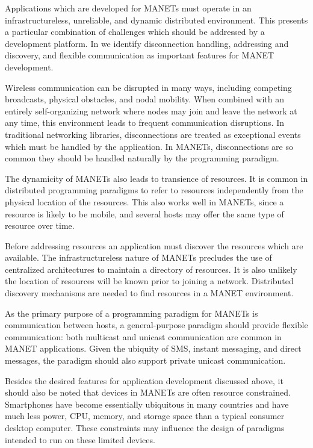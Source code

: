 \documentclass[lnicst]{svmultln}
\begin{document}
Applications which are developed for MANETs must operate in an infrastructureless, unreliable, and dynamic distributed environment. This presents a particular combination of challenges which should be addressed by a development platform. In \cite{mine} we identify disconnection handling, addressing and discovery, and flexible communication as important features for MANET development.

Wireless communication can be disrupted in many ways, including competing broadcasts, physical obstacles, and nodal mobility. When combined with an entirely self-organizing network where nodes may join and leave the network at any time, this environment leads to frequent communication disruptions. In traditional networking libraries, disconnections are treated as exceptional events which must be handled by the application. In MANETs, disconnections are so common they should be handled naturally by the programming paradigm.

The dynamicity of MANETs also leads to transience of resources. It is common in distributed programming paradigms to refer to resources independently from the physical location of the resources. This also works well in MANETs, since a resource is likely to be mobile, and several hosts may offer the same type of resource over time.

Before addressing resources an application must discover the resources which are available. The infrastructureless nature of MANETs precludes the use of centralized architectures to maintain a directory of resources. It is also unlikely the location of resources will be known prior to joining a network. Distributed discovery mechanisms are needed to find resources in a MANET environment.

As the primary purpose of a programming paradigm for MANETs is communication between hosts, a general-purpose paradigm should provide flexible communication: both multicast and unicast communication are common in MANET applications. Given the ubiquity of SMS, instant messaging, and direct messages, the paradigm should also support private unicast communication.

Besides the desired features for application development discussed above, it should also be noted that devices in MANETs are often resource constrained. Smartphones have become essentially ubiquitous in many countries and have much less power, CPU, memory, and storage space than a typical consumer desktop computer. These constraints may influence the design of paradigms intended to run on these limited devices.
\end{document}
